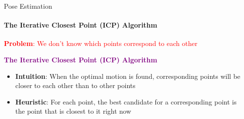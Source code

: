 \documentclass[aspectratio=169]{beamer}
\begin{document}
\begin{frame}[fragile, t]{Pose Estimation}
	\framesubtitle{The Iterative Closest Point (ICP) Algorithm}
	\begin{minipage}{0.6\textwidth}

	\begin{block}{}
		\textcolor{red}{\textbf{Problem}: We don’t know which points correspond to each other}
	\end{block}

	\vspace{0.3in}

	\textcolor{purple}{\textbf{The Iterative Closest Point (ICP) Algorithm}}

    \begin{itemize}
        \item \textbf{Intuition}: When the optimal motion is found, corresponding points will be closer to each other than to other points
        \item  \textbf{Heuristic}: For each point, the best candidate for a corresponding point is the point that is closest to it right now
    \end{itemize}

\end{minipage}
\begin{minipage}{0.4\textwidth}
	\begin{figure}
		
	\end{figure}
\end{minipage}
\end{frame}
\end{document}
